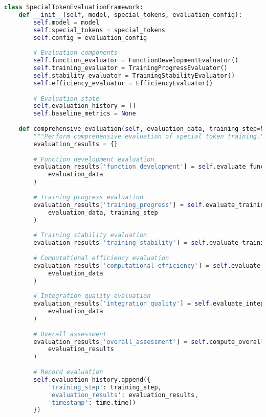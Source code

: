 \begin{lstlisting}[language=Python, caption=Comprehensive evaluation metrics framework for special token training]
class SpecialTokenEvaluationFramework:
    def __init__(self, model, special_tokens, evaluation_config):
        self.model = model
        self.special_tokens = special_tokens
        self.config = evaluation_config
        
        # Evaluation components
        self.function_evaluator = FunctionDevelopmentEvaluator()
        self.training_evaluator = TrainingProgressEvaluator()
        self.stability_evaluator = TrainingStabilityEvaluator()
        self.efficiency_evaluator = EfficiencyEvaluator()
        
        # Evaluation state
        self.evaluation_history = []
        self.baseline_metrics = None
        
    def comprehensive_evaluation(self, evaluation_data, training_step=None):
        """Perform comprehensive evaluation of special token training."""
        evaluation_results = {}
        
        # Function development evaluation
        evaluation_results['function_development'] = self.evaluate_function_development(
            evaluation_data
        )
        
        # Training progress evaluation
        evaluation_results['training_progress'] = self.evaluate_training_progress(
            evaluation_data, training_step
        )
        
        # Training stability evaluation
        evaluation_results['training_stability'] = self.evaluate_training_stability()
        
        # Computational efficiency evaluation
        evaluation_results['computational_efficiency'] = self.evaluate_computational_efficiency(
            evaluation_data
        )
        
        # Integration quality evaluation
        evaluation_results['integration_quality'] = self.evaluate_integration_quality(
            evaluation_data
        )
        
        # Overall assessment
        evaluation_results['overall_assessment'] = self.compute_overall_assessment(
            evaluation_results
        )
        
        # Record evaluation
        self.evaluation_history.append({
            'training_step': training_step,
            'evaluation_results': evaluation_results,
            'timestamp': time.time()
        })
        

\end{lstlisting}
